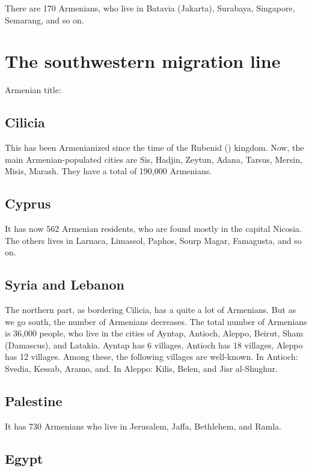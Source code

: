 There are 170 Armenians, who live in Batavia (Jakarta), Surabaya, Singapore, Semarang, and so on. 

\section{The southwestern migration line}

Armenian title: 


\subsection{Cilicia}

This has been Armenianized since the time of the Rubenid () kingdom. Now, the main Armenian-populated cities are Sis, Hadjin, Zeytun, Adana, Tarsus, Mersin, Misis, Marash. They have a total of 190,000 Armenians.

\subsection{Cyprus}

It has now 562 Armenian residents, who are found mostly in the capital Nicosia. The others lives in Larnaca, Limassol, Paphos, Sourp Magar, Famagusta, and so on. 

\subsection{Syria and Lebanon}

The northern part, as bordering Cilicia, has a quite a lot of Armenians. But as we go south, the number of Armenians decreases. The total number of Armenians is 36,000 people, who live in the cities of Ayntap, Antioch, Aleppo, Beirut, Sham (Damascus), and Latakia. Ayntap has 6 villages, Antioch has 18 villages, Aleppo has 12 villages. Among these, the following villages are well-known. In Antioch: Svedia, Kessab, Aramo, and. In Aleppo: Kilis, Belen, and Jisr al-Shughur.

\subsection{Palestine}
It has 730 Armenians who live in Jerusalem, Jaffa, Bethlehem, and Ramla. 

\subsection{Egypt}

